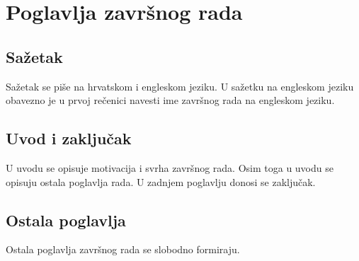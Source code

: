 \section{Poglavlja završnog rada}
\subsection{Sažetak}
Sažetak se piše na hrvatskom i engleskom jeziku. U sažetku na engleskom jeziku obavezno je u prvoj rečenici navesti ime završnog rada na engleskom jeziku.
\subsection{Uvod i zaključak}
U uvodu se opisuje motivacija i svrha završnog rada. Osim toga u uvodu se opisuju ostala poglavlja rada. U zadnjem poglavlju donosi se zaključak. 


\subsection{Ostala poglavlja}
Ostala poglavlja završnog rada se slobodno formiraju. 

